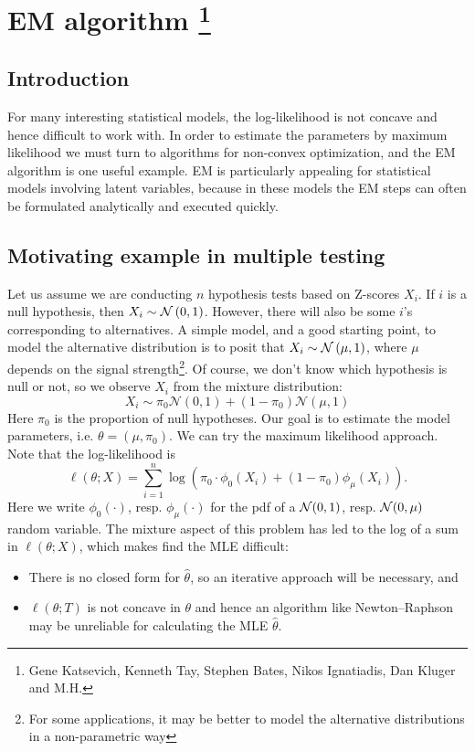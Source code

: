 
\section{EM algorithm \footnote{Gene Katsevich, Kenneth Tay, Stephen Bates, Nikos Ignatiadis, Dan Kluger and M.H.}}
\label{sec:review_EM}

\subsection{Introduction}
For many interesting statistical models, the log-likelihood is not concave and hence difficult to work with. In order to estimate the parameters by maximum likelihood we must turn to algorithms for non-convex optimization, and the EM algorithm is one useful example. EM is particularly appealing for statistical models involving latent variables, because in these models the EM steps can often be formulated analytically and executed quickly.

\subsection{Motivating example in multiple testing}\label{sec:MT}

Let us assume we are conducting $n$ hypothesis tests based on Z-scores $X_i$. If $i$ is a null hypothesis, then $X_i \sim \mathcal{N}\left(0,1\right)$. However, there will also be some $i$'s corresponding to alternatives. A simple model, and a good starting point, to model the alternative distribution is to posit that $X_i \sim \mathcal{N}\left(\mu,1\right)$, where $\mu$ depends on the signal strength\footnote{For some applications, it may be better to model the alternative distributions in a non-parametric way}. Of course, we don't know which hypothesis is null or not, so we observe $X_i$ from the mixture distribution:
$$ X_i \sim \pi_0 \mathcal{N}(0,1) + (1-\pi_0)\mathcal{N}(\mu, 1)$$
Here $\pi_0$ is the proportion of null hypotheses. Our goal is to estimate the model parameters, i.e. $\theta = (\mu, \pi_0)$. We can try the maximum likelihood approach. Note that the log-likelihood is
\[ \ell (\theta; X) = \sum_{i=1}^n \log \left( \pi_0 \cdot \phi_0(X_i) + (1 - \pi_0) \phi_{\mu}(X_i) \right). \]
Here we write $\phi_{0}(\cdot)$, resp. $\phi_{\mu}(\cdot)$ for the pdf of a $\mathcal{N}(0,1)$, resp. $\mathcal{N}(0, \mu)$ random variable.  The mixture aspect of this problem has led to the log of a sum in $\ell(\theta; X)$, which makes find the MLE difficult:
\begin{itemize}
\item There is no closed form for $\hat{\theta}$, so an iterative approach will be necessary, and
\item $\ell(\theta; T)$ is not concave in $\theta$ and hence an algorithm like Newton--Raphson may be unreliable for calculating the MLE $\hat{\theta}$.
\end{itemize}

